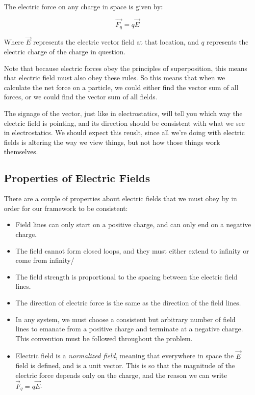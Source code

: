 \documentclass{report}
\theoremstyle{definition}
\numberwithin{equation}{section}
\numberwithin{definition}{section}
\begin{document}
    \begin{theorem}
        The electric force on any charge in space is given by:

        \[ \vec{F_q} = q\vec{E}\] 

        Where $\vec{E}$ represents the electric vector field at that location, and $q$ represents the electric charge of the charge in question.
    \end{theorem}

    Note that because electric forces obey the principles of superposition, this means that electric field must also obey these rules. So this means that when we calculate the net force on a particle, we could either find the vector sum of all forces, or we could find the vector sum of all fields. 
    
    The signage of the vector, just like in electrostatics, will tell you which way the electric field is pointing, and its direction should be consistent with what we see in electrostatics. We should expect this reuslt, since all we're doing with electric fields is altering the way we view things, but not how those things work themselves. 

\subsection{Properties of Electric Fields}

    There are a couple of properties about electric fields that we must obey by in order for our framework to be consistent:

    \begin{itemize}
        \item Field lines can only start on a positive charge, and can only end on a negative charge.
        \item The field cannot form closed loops, and they must either extend to infinity or come from infinity/
        \item The field strength is proportional to the spacing between the electric field lines.
        \item The direction of electric force is the same as the direction of the field lines.
        \item In any system, we must choose a consistent but arbitrary number of field lines to emanate from a positive charge and terminate at a negative charge. This convention must be followed throughout the problem.
        \item Electric field is a \textit{normalized field}, meaning that everywhere in space the $\vec{E}$ field is defined, and is a unit vector. This is so that the magnitude of the electric force depends only on the charge, and the reason we can write $\vec{F}_q = q\vec{E}$.
    \end{itemize}
\end{document}
